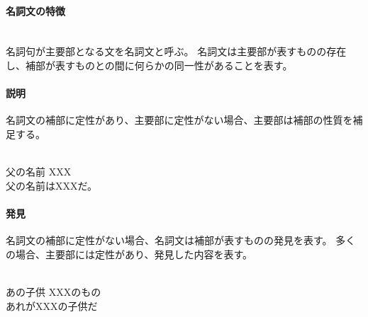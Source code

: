 \paragraph{名詞文の特徴}\quad\\
名詞句が主要部となる文を名詞文と呼ぶ。
名詞文は主要部が表すものの存在し、補部が表すものとの間に何らかの同一性があることを表す。

\paragraph{説明}
名詞文の補部に定性があり、主要部に定性がない場合、主要部は補部の性質を補足する。

\begin{exe}
    \ex \gll [u\'ak\'a ap\'a piku\'o] [XXX] \\
        父の名前 XXX \\
    \glt 父の名前はXXXだ。
\end{exe}

\paragraph{発見}
名詞文の補部に定性がない場合、名詞文は補部が表すものの発見を表す。
多くの場合、主要部には定性があり、発見した内容を表す。

\begin{exe}
    \ex \gll [r\'i\'i mipop\'a] [XXX k\'a\'a] \\
        あの子供 XXXのもの \\
    \glt あれがXXXの子供だ
\end{exe}
